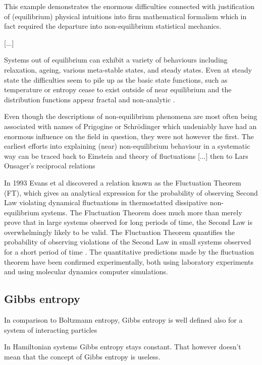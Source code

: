 \documentclass[a4paper,12pt,nofootinbib]{article}
\begin{document}
This example demonstrates the enormous difficulties connected with justification of (equilibrium) physical intuitions into firm mathematical formalism which in fact required the departure into non-equilibrium statistical mechanics.

[...]

Systems out of equilibrium can exhibit a variety of behaviours including relaxation, ageing, various meta-stable states, and steady states.
Even at steady state the difficulties seem to pile up as the basic state functions, such as temperature or entropy cease to exist outside of near equilibrium and the distribution functions appear fractal and non-analytic \cite{Dewar:2014ek}.

Even though the descriptions of non-equilibrium phenomena are most often being associated with names of Prigogine or Schr{\" o}dinger which undeniably have had an enormous influence on the field in question, they were not however the first.
The earliest efforts into explaining (near) non-equilibrium behaviour in a systematic way can be traced back to Einstein and theory of fluctuations [...] then to Lars Onsager's reciprocal relations


In 1993 Evans et al discovered a relation known as the Fluctuation Theorem (FT), which gives an analytical expression for the probability of observing Second Law violating dynamical fluctuations in thermostatted dissipative non-equilibrium systems.
The Fluctuation Theorem does much more than merely prove that in large systems observed for long periods of time, the Second Law is overwhelmingly likely to be valid. The Fluctuation Theorem quantifies the probability of observing violations of the Second Law in small systems observed for a short period of time \cite{Evans:2002gy}. The quantitative predictions made by the fluctuation theorem have been confirmed experimentally, both using laboratory experiments and using molecular dynamics computer simulations.

\subsection{Gibbs entropy}

In comparison to Boltzmann entropy, Gibbs entropy is well defined also for a system of interacting particles



In Hamiltonian systems Gibbs entropy stays constant.
That however doesn't mean that the concept of Gibbs entropy 
is useless.
\end{document}
